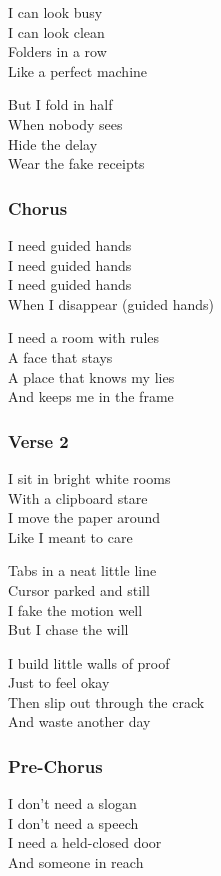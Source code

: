 I can look busy\\
I can look clean\\
Folders in a row\\
Like a perfect machine

But I fold in half\\
When nobody sees\\
Hide the delay\\
Wear the fake receipts

\subsubsection{Chorus}\label{chorus-15}

I need guided hands\\
I need guided hands\\
I need guided hands\\
When I disappear (guided hands)

I need a room with rules\\
A face that stays\\
A place that knows my lies\\
And keeps me in the frame

\subsubsection{Verse 2}\label{verse-2-4}

I sit in bright white rooms\\
With a clipboard stare\\
I move the paper around\\
Like I meant to care

Tabs in a neat little line\\
Cursor parked and still\\
I fake the motion well\\
But I chase the will

I build little walls of proof\\
Just to feel okay\\
Then slip out through the crack\\
And waste another day

\subsubsection{Pre-Chorus}\label{pre-chorus-7}

I don't need a slogan\\
I don't need a speech\\
I need a held-closed door\\
And someone in reach

